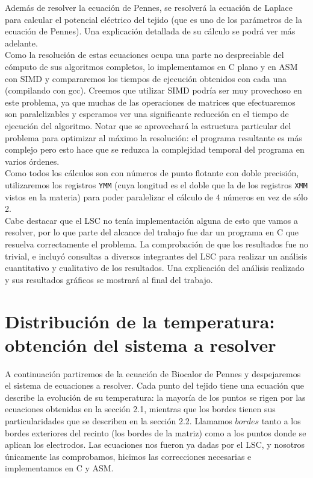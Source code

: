 \documentclass[a4paper]{article}
\begin{document}
Además de resolver la ecuación de Pennes, se resolverá la ecuación
de Laplace para calcular el potencial eléctrico del tejido (que es uno de los parámetros
de la ecuación de Pennes). Una explicación detallada de su cálculo se podrá ver más adelante.\\

Como la resolución de estas ecuaciones ocupa una parte no despreciable 
del cómputo de sus algoritmos completos, lo implementamos en C plano y en ASM con SIMD y 
compararemos los tiempos de ejecución obtenidos con cada una (compilando con gcc). Creemos que 
utilizar SIMD podría ser muy provechoso en este problema, ya que muchas 
de las operaciones de matrices que efectuaremos son paralelizables y 
esperamos ver una significante reducción en el tiempo de ejecución del 
algoritmo. Notar que se aprovechará la estructura particular del problema para optimizar al máximo la
resolución: el programa resultante es más complejo pero esto hace que se reduzca la complejidad
temporal del programa en varios órdenes.\\

Como todos los cálculos son con números de punto flotante con doble 
precisión, utilizaremos los registros \texttt{YMM} (cuya longitud es el doble que la de los
registros \texttt{XMM} vistos en la materia) para poder paralelizar el cálculo de 4 números en vez de sólo 2.\\

Cabe destacar que el LSC no tenía implementación alguna de esto que vamos
a resolver, por lo que parte del alcance del trabajo fue dar un programa
en C que resuelva correctamente el problema. La comprobación de que los resultados 
fue no trivial, e incluyó consultas a diversos integrantes del LSC para
realizar un análisis cuantitativo y cualitativo de los resultados. Una explicación del
análisis realizado y sus resultados gráficos se mostrará al final del trabajo.

\newpage
\section{Distribuci\'on de la temperatura: obtención del sistema a resolver}

A continuación partiremos de la ecuación de Biocalor de Pennes y despejaremos
el sistema de ecuaciones a resolver. Cada punto del tejido tiene una 
ecuación que describe la evolución de su temperatura: la mayoría de los puntos
se rigen por las ecuaciones obtenidas en la sección 2.1, mientras que los bordes
tienen sus particularidades que se describen en la sección 2.2. 
Llamamos $bordes$ tanto a los bordes exteriores del recinto
(los bordes de la matriz) como a los puntos donde se aplican los electrodos.
Las ecuaciones nos fueron ya dadas por el LSC, y nosotros únicamente las 
comprobamos, hicimos las correcciones necesarias e implementamos en C y ASM.
\end{document}
